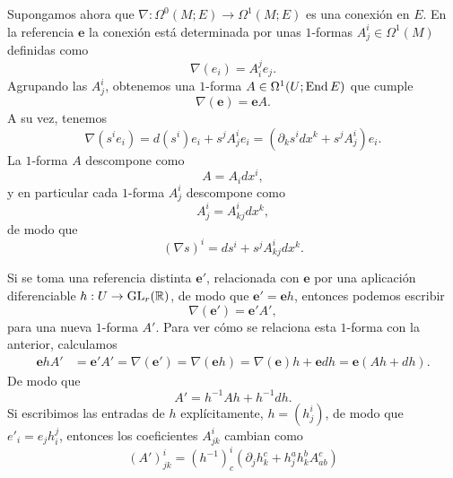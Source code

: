 \documentclass[11pt,a4paper]{amsbook}
\theoremstyle{remark} \newtheorem{rmk}[subsection]{Observación}
\theoremstyle{definition} \newtheorem{defn}[subsection]{Definición}
\theoremstyle{definition} \newtheorem{ex}[subsection]{Ejemplo}
\theoremstyle{definition} \newtheorem{ej}[subsection]{Ejercicio}
\begin{document}
Supongamos ahora que $\nabla: \Omega^0(M;E) \rightarrow \Omega^1(M;E)$ es una conexión en $E$. En la referencia $\bm{e}$ la conexión está determinada por unas $1$-formas $A^i_{j} \in \Omega^1(M)$ definidas como
\begin{equation*}
\nabla(e_i) =A^j_i  e_j.
\end{equation*}
Agrupando las $A^i_j$, obtenemos una $1$-forma $A\in \Omega^1(U;\operatorname{End} E)$ que cumple
\begin{equation*}
\nabla(\bm{e}) = \bm{e} A.
\end{equation*}
A su vez, tenemos
\begin{equation*}
\nabla(s^i e_i) = d(s^i) e_i + s^jA^i_je_i =(\partial_k s^i dx^k+ s^jA^i_{j}) e_i .
\end{equation*}
La $1$-forma $A$ descompone como
\begin{equation*}
A = A_i dx^i,
\end{equation*}
y en particular cada $1$-forma $A^i_j$ descompone como
\begin{equation*}
A^i_j=A^i_{kj} dx^k,
\end{equation*}
de modo que
\begin{equation*}
(\nabla s)^i = ds^i + s^j A^i_{kj} dx^k .
\end{equation*}

Si se toma una referencia distinta $\bm{e}'$, relacionada con $\bm{e}$ por una aplicación diferenciable $h:U\rightarrow \operatorname{GL}_r(\mathbb R)$, de modo que $\bm{e}'=\bm{e} h$, entonces podemos escribir
\begin{equation*}
\nabla(\bm{e}') = \bm{e}' A',
\end{equation*}
para una nueva $1$-forma $A'$. Para ver cómo se relaciona esta $1$-forma con la anterior, calculamos
\begin{align*}
\bm{e} h A' &= \bm{e}' A' = \nabla(\bm{e'}) = \nabla(\bm{e} h) = \nabla(\bm{e}) h + \bm{e} dh = \bm{e} (A h + dh).
\end{align*}
De modo que
\begin{equation*}
A' = h^{-1} A h + h^{-1} dh.
\end{equation*}
Si escribimos las entradas de $h$ explícitamente, $h=(h^i_j)$, de modo que $e'_i=e_jh^j_i$, entonces los coeficientes $A^i_{jk}$ cambian como
\begin{equation*}
(A')^i_{jk} = (h^{-1})^i_c (\partial_j h_k^c + h_j^a h_k^b A_{ab}^c)
\end{equation*}
\end{document}
